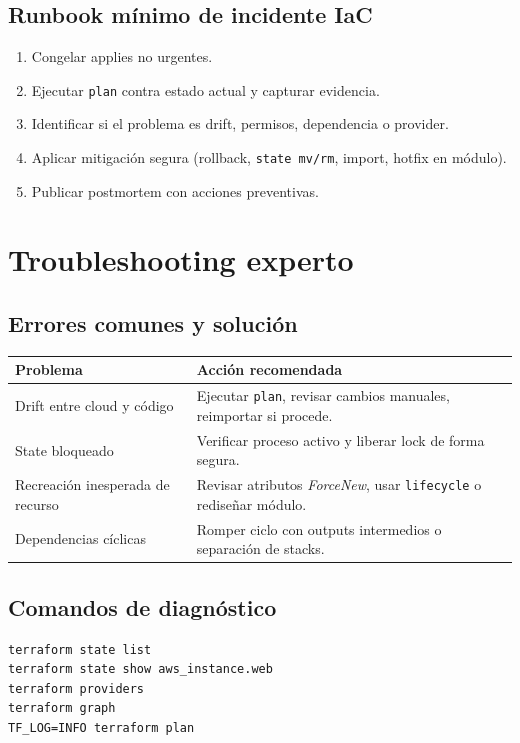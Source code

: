 \documentclass[12pt,a4paper]{article}
\begin{document}
\subsection{Runbook mínimo de incidente IaC}
\begin{enumerate}
	\item Congelar applies no urgentes.
	\item Ejecutar \texttt{plan} contra estado actual y capturar evidencia.
	\item Identificar si el problema es drift, permisos, dependencia o provider.
	\item Aplicar mitigación segura (rollback, \texttt{state mv/rm}, import, hotfix en módulo).
	\item Publicar postmortem con acciones preventivas.
\end{enumerate}

\section{Troubleshooting experto}

\subsection{Errores comunes y solución}
\begin{longtable}{p{} p{}}
\toprule
\textbf{Problema} & \textbf{Acción recomendada} \\
\midrule
Drift entre cloud y código & Ejecutar \texttt{plan}, revisar cambios manuales, reimportar si procede. \\
State bloqueado & Verificar proceso activo y liberar lock de forma segura. \\
Recreación inesperada de recurso & Revisar atributos \textit{ForceNew}, usar \texttt{lifecycle} o rediseñar módulo. \\
Dependencias cíclicas & Romper ciclo con outputs intermedios o separación de stacks. \\
\bottomrule
\end{longtable}

\subsection{Comandos de diagnóstico}
\begin{lstlisting}[caption=Comandos útiles de depuración]
terraform state list
terraform state show aws_instance.web
terraform providers
terraform graph
TF_LOG=INFO terraform plan
\end{lstlisting}
\end{document}
